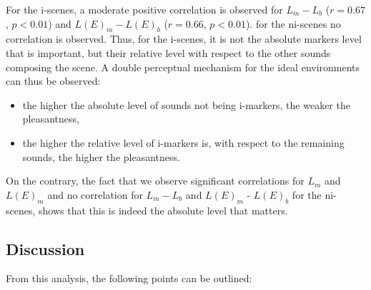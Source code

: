 \documentclass[12pt]{elsarticle}
\begin{document}
For the i-scenes, a moderate positive correlation is observed for $L_m-L_b$ ($r=0.67$, $p<0.01$) and $L(E)_m-L(E)_b$ ($r=0.66$, $p<0.01$). for the ni-scenes no correlation is observed. Thus, for the i-scenes, it is not the absolute markers level that is important, but their relative level with respect to the other sounds composing the scene. A double perceptual mechanism for the ideal environments can thus be observed:


\begin{itemize}
\item the higher the absolute level of sounds not being i-markers, the weaker the pleasantness,
\item the higher the relative level of i-markers is, with respect to the remaining sounds, the higher the pleasantness.
\end{itemize}


On the contrary, the fact that we observe significant correlations for $L_m$ and $L(E)_m$ and no correlation for $L_m-L_b$ and $L(E)_m$ - $L(E)_b$ for the ni-scenes, shows that this is indeed the absolute level that matters.

\subsection{Discussion}


From this analysis, the following points can be outlined:
\end{document}

